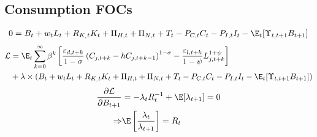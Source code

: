 \subsection{Consumption FOCs}
\begin{align}
    0 = B_t + w_tL_t + R_{K_,t}K_t + \Pi_{H,t}+ \Pi_{N,t} + T_t - P_{C,t}C_{t} - P_{I,t}I_t - \E_t[\Upsilon_{t,t+1}B_{t+1}]
\end{align}
\begin{align}
    \mathcal{L} & = \E_t \sum_{k=0}^{\infty} \beta^{k}
    \left[
    \frac{\varepsilon_{d, t+k}}{1-\sigma}\left(C_{j, t+k} -hC_{j,t+k-1} \right)^{1-\sigma} - \frac{\varepsilon_{l, t+k}}{1-\psi}L_{j, t+k}^{1+\psi}
    \right]                                            \\ &+
    \lambda \times (B_t + w_tL_t + R_{K_,t}K_t + \Pi_{H,t}+ \Pi_{N,t} + T_t - P_{C,t}C_{t} - P_{I,t}I_t - \E_t[\Upsilon_{t,t+1}B_{t+1}])
\end{align}
\begin{align}
    \frac{\partial \mathcal{L}}{\partial B_{t+1}} & = -\lambda_tR_t^{-1} + \E[\lambda_{t+1}] = 0            \\
    \Rightarrow                                   & \E \left[ \frac{\lambda_t}{\lambda_{t+1}} \right] = R_t
\end{align}
